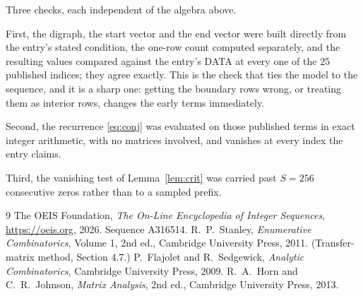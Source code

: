 \documentclass[11pt,a4paper]{article}
\theoremstyle{plain}
\theoremstyle{definition}
\begin{document}
Three checks, each independent of the algebra above.

First, the digraph, the start vector and the end vector were built directly from the
entry's stated condition, the one-row count computed separately, and the resulting values
compared against the entry's DATA at every one of the $25$ published indices; they
agree exactly. This is the check that ties the model to the sequence, and it is a sharp one:
getting the boundary rows wrong, or treating them as interior rows, changes the early terms
immediately.

Second, the recurrence \eqref{eq:conj} was evaluated on those published terms in exact
integer arithmetic, with no matrices involved, and vanishes at every index the entry claims.

Third, the vanishing test of Lemma~\ref{lem:crit} was carried past $S=256$ consecutive
zeros rather than to a sampled prefix.

\begin{thebibliography}{9}
 The OEIS Foundation, \emph{The On-Line Encyclopedia of Integer
Sequences}, \url{https://oeis.org}, 2026. Sequence A316514.
 R.~P.~Stanley, \emph{Enumerative Combinatorics}, Volume 1, 2nd ed.,
Cambridge University Press, 2011. (Transfer-matrix method, Section 4.7.)
 P.~Flajolet and R.~Sedgewick, \emph{Analytic Combinatorics}, Cambridge
University Press, 2009.
 R.~A.~Horn and C.~R.~Johnson, \emph{Matrix Analysis}, 2nd ed., Cambridge
University Press, 2013.
\end{thebibliography}
\end{document}
